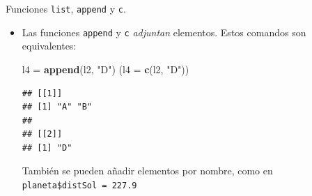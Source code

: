 \documentclass[
  9pt,
  ignorenonframetext,
]{beamer}
\newenvironment{Shaded}{\begin{snugshade}}{\end{snugshade}}
\newcommand{\DataTypeTok}[1]{\textcolor[rgb]{0.13,0.29,0.53}{#1}}
\newcommand{\KeywordTok}[1]{\textcolor[rgb]{0.13,0.29,0.53}{\textbf{#1}}}
\newcommand{\NormalTok}[1]{#1}
\newcommand{\StringTok}[1]{\textcolor[rgb]{0.31,0.60,0.02}{#1}}
\begin{document}
\begin{frame}[fragile]{Funciones \texttt{list}, \texttt{append} y
\texttt{c}.}
\begin{itemize}
  \normalsize
\item
  Las funciones \texttt{append} y \texttt{c} \emph{adjuntan} elementos.
  Estos comandos son equivalentes:\scriptsize

\begin{Shaded}
\begin{Highlighting}[]
\NormalTok{l4 =}\StringTok{ }\KeywordTok{append}\NormalTok{(l2, }\StringTok{"D"}\NormalTok{)}
\NormalTok{(}\DataTypeTok{l4 =} \KeywordTok{c}\NormalTok{(l2, }\StringTok{"D"}\NormalTok{))}
\end{Highlighting}
\end{Shaded}

\begin{verbatim}
## [[1]]
## [1] "A" "B"
## 
## [[2]]
## [1] "D"
\end{verbatim}

  \normalsize También se pueden añadir elementos por nombre, como en\\
  \small \texttt{planeta\$distSol\ =\ 227.9} \normalsize 
\end{itemize}

\end{frame}
\end{document}
